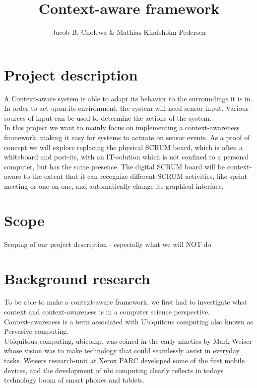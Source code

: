 \documentclass[]{report}
\title{Context-aware framework}
\author{Jacob B. Cholewa \& Mathias Kindsholm Pedersen}
\begin{document}
\maketitle

\begin{abstract}
\end{abstract}


\chapter{Project description}
A Context-aware system is able to adapt its behavior to the surroundings it is in. In order to act upon its environment, the system will need sensor-input. Various sources of input can be used to determine the actions of the system.\\

In this project we want to mainly focus on implementing a context-awareness framework, making it easy for systems to actuate on sensor events. As a proof of concept we will explore replacing the physical SCRUM board, which is often a whiteboard and post-its, with an IT-solution which is not confined to a personal computer, but has the same presence. The digital SCRUM board will be context-aware to the extent that it can recognize different SCRUM activities, like sprint meeting or one-on-one, and automatically change its graphical interface.


\chapter{Scope}
Scoping of our project description - especially what we will NOT do

\chapter{Background research}


To be able to make a context-aware framework, we first had to investigate what context and context-awareness is in a computer science perspective.\\

Context-awareness is a term associated with Ubiquitous computing also known as Pervasive computing.\\

Ubiquitous computing, ubicomp, was coined in the early nineties by Mark Weiser whose vision was to make technology that could seamlessly assist in everyday tasks. Weisers research-unit at Xerox PARC developed some of the first mobile devices, and the development of ubi computing clearly reflects in todays technology boom of smart phones and tablets.\\
\end{document}
